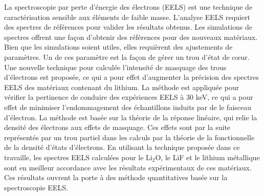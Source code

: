 

La spectroscopie par perte d'\'energie des \'electrons (EELS) est une technique de caract\'erisation sensible aux \'el\'ements de faible masse.  L'analyse EELS requiert des spectres de r\'ef\'erences pour valider les r\'esultats obtenus. Les simulations de spectres offrent une façon d'obtenir des r\'ef\'erences pour des nouveaux mat\'eriaux.  Bien que les simulations soient utiles, elles requi\`erent des ajustements de param\`etres.  Un de ces param\`etre est la fa\c{c}on de g\'erer un trou d'\'etat de c\oe ur. Une nouvelle technique pour calcul\'ee l'intensit\'e de masquage des trous d'\'electrons est propos\'ee, ce qui a pour effet d'augmenter la pr\'ecision des spectres EELS des mat\'eriaux contenant du lithium. La m\'ethode est appliqu\'ee pour v\'erifier la pertinence de conduire des exp\'eriences EELS \`a 30 keV, ce qui a pour effet de minimiser l'endommagement des \'echantillons induits par de le faisceau d'\'electron. La m\'ethode est bas\'ee sur la th\'eorie de la r\'eponse lin\'eaire, qui relie la densit\'e des \'electrons aux effets de masquage. Ces effets sont par la suite repr\'esent\'es par un trou partiel dans les calculs par la th\'eorie de la fonctionnelle de la densit\'e d'\'etats d'\'electrons. En utilisant la technique propos\'ee dans ce travaille, les spectres EELS calcul\'ees pour le $\mathrm{Li_2O}$, le LiF et le lithium m\'etallique sont en meilleur accordance avec les r\'esultats exp\'erimentaux de ces mat\'eriaux. Ces r\'esultats ouvrent la porte \`a des m\'ethode quantitatives bas\'ee sur la spectroscopie EELS.

